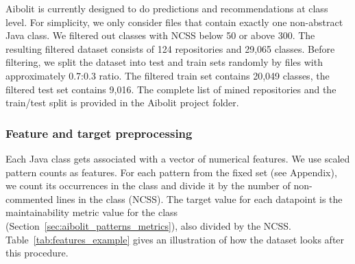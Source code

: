 Aibolit is currently designed to do predictions and recommendations at class
level. For simplicity, we only consider files that contain exactly one
non-abstract Java class.
We filtered out classes with NCSS below 50 or above 300.
The resulting filtered dataset consists of 124 repositories and
29,065 classes. Before filtering, we split the dataset into test and train sets randomly by files with
approximately 0.7:0.3 ratio. The filtered train set contains 20,049 classes,
the filtered test set contains 9,016.
The complete list of mined repositories and the train/test split is provided in the Aibolit
project folder.

\subsubsection*{Feature and target preprocessing}

Each Java class gets
associated with a vector of numerical features. We use scaled pattern counts as
features. For each pattern from the fixed set
(see Appendix), we count its occurrences in the
class and divide it by the number of non-commented lines in the class (NCSS).
The target value for each datapoint is the maintainability metric value for the
class (Section~\ref{sec:aibolit_patterns_metrics}), also divided by the NCSS.
Table~\ref{tab:features_example}
gives an illustration of how the dataset looks after this procedure.


%
%


